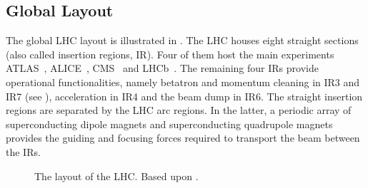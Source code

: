 \subsection{Global Layout}
%
The global LHC layout is illustrated in . The LHC houses eight straight sections (also called insertion regions, IR). Four of them host the main experiments ATLAS~\cite{ATLASref01}, \mbox{ALICE}~\cite{ALICEref01}, CMS~\cite{CMSref01} and LHCb~\cite{LHCbref01}. The remaining four IRs provide operational functionalities, namely betatron and momentum cleaning in IR3 and IR7 (see ), acceleration in IR4 and the beam dump in IR6. The straight insertion regions are separated by the LHC arc regions. In the latter, a periodic array of superconducting dipole magnets and superconducting quadrupole magnets provides the guiding and focusing forces required to transport the beam between the IRs. 

%
%


\begin{figure}[b]
  \centering
  \caption{The layout of the LHC. Based upon \cite{Bruning2012705,CERN-2004-003-V1}.}  
  \label{pic:15032201}
  \end{figure}





